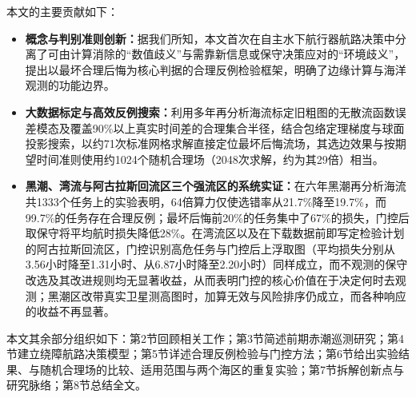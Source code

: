本文的主要贡献如下：
\begin{itemize}
    \item \textbf{概念与判别准则创新：}据我们所知，本文首次在自主水下航行器航路决策中分离了可由计算消除的“数值歧义”与需靠新信息或保守决策应对的“环境歧义”，提出以最坏合理后悔为核心判据的合理反例检验框架，明确了边缘计算与海洋观测的功能边界。
    \item \textbf{大数据标定与高效反例搜索：}利用多年再分析海流标定旧粗图的无散流函数误差模态及覆盖90\%以上真实时间差的合理集合半径，结合包络定理梯度与球面投影搜索，以约71次标准网格求解直接定位最坏后悔流场，其选边效果与按期望时间准则使用约1024个随机合理场（2048次求解，约为其29倍）相当。
    \item \textbf{黑潮、湾流与阿古拉斯回流区三个强流区的系统实证：}在六年黑潮再分析海流共1333个任务上的实验表明，64倍算力仅使选错率从21.7\%降至19.7\%，而99.7\%的任务存在合理反例；最坏后悔前20\%的任务集中了67\%的损失，门控后取保守将平均航时损失降低28\%。在湾流区以及在下载数据前即写定检验计划的阿古拉斯回流区，门控识别高危任务与门控后上浮取图（平均损失分别从3.56小时降至1.31小时、从6.87小时降至2.20小时）同样成立，而不观测的保守改选及其改进规则均无显著收益，从而表明门控的核心价值在于决定何时去观测；黑潮区改带真实卫星测高图时，加算无效与风险排序仍成立，而各种响应的收益不再显著。
\end{itemize}

本文其余部分组织如下：第2节回顾相关工作；第3节简述前期赤潮巡测研究；第4节建立绕障航路决策模型；第5节详述合理反例检验与门控方法；第6节给出实验结果、与随机合理场的比较、适用范围与两个海区的重复实验；第7节拆解创新点与研究脉络；第8节总结全文。
